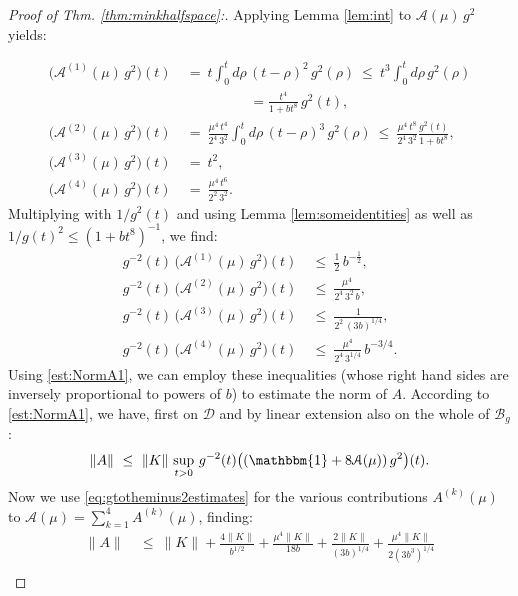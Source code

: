 \documentclass[b5paper,draft,openbib,12pt]{memoir}
\newcommand{\id}{\mathbbm{1}}
\newcommand{\Banach}{\mathscr{B}}
\begin{document}
\begin{proof}[Proof of Thm. \ref{thm:minkhalfspace}:] Applying 
Lemma \ref{lem:int} to \(\mathcal{A}(\mu) \,g^2\) yields:

\begin{align}
    \big(\mathcal{A}^{(1)}(\mu) \, g^2\big)(t)&~=~ t \int_0^t d\rho \, (t-\rho)^2\, g^2(\rho)~\le~ t^3 \int_0^t d\rho \,g^2(\rho)\nonumber\\
    &\hspace{2cm} = \frac{t^4}{1+b t^8} \,g^2(t),\nonumber\\
     \big(\mathcal{A}^{(2)}(\mu) \, g^2\big)(t)&~=~ \frac{\mu^4\, t^4}{2^4\, 3^2} \int_0^t d\rho\, (t-\rho)^3\, g^2(\rho)~\le~ \frac{\mu^4\, t^8}{2^4 \,3^2} \frac{g^2(t)}{1+b t^8},\nonumber\\
    \big( \mathcal{A}^{(3)}(\mu) \, g^2\big) (t) &~=~ t^2,\nonumber\\
    \big( \mathcal{A}^{(4)}(\mu) \, g^2 \big)(t) &~=~ \frac{\mu^4\, t^6}{2^2\, 3^2}.
\end{align}
Multiplying with \(1/g^2(t)\) and using Lemma 
\ref{lem:someidentities} as well as $1/g(t)^2 \le (1+b t^8)^{-1}$, 
we find:
\begin{align}
    g^{-2}(t)\, \big(\mathcal{A}^{(1)}(\mu) \,g^2\big)(t) & ~\le~ \frac{1}{2} \, b^{-\frac{1}{2}},\nonumber\\
    g^{-2}(t)\, \big(\mathcal{A}^{(2)}(\mu) \,g^2\big)(t) & ~\le~ \frac{\mu^4}{2^4 \,3^2 \,b},\nonumber\\
    g^{-2}(t)\, \big( \mathcal{A}^{(3)}(\mu) \, g^2\big)(t) & ~\le~ \frac{1}{2^2\, (3b)^{1/4}},\nonumber\\
   g^{-2}(t)\, \big( \mathcal{A}^{(4)}(\mu) \, g^2\big) (t) & ~\le~ \frac{\mu^4}{2^4 \, 3^{1/4}} \, b^{-3/4}.
\label{eq:gtotheminus2estimates}
\end{align}
Using \eqref{est:NormA1}, we can employ these inequalities (whose 
right hand sides are inversely proportional to powers of $b$) to 
estimate the norm of $A$. According to \eqref{est:NormA1}, we have, 
first on $\mathscr{D}$ and by linear extension also on the whole of 
$\Banach_g$: 
\begin{equation}
	\|A\| ~\leq~ \|K\| \, \sup_{t>0}\, g^{-2}(t) \big((\id + 8\mathcal{A}(\mu)) \, g^2 \big)(t) .
\end{equation}
Now we use \eqref{eq:gtotheminus2estimates} for the various 
contributions 
$A^{(k)}(\mu) $ to $\mathcal{A}(\mu) = \sum_{k=1}^4 A^{(k)}(\mu)$, 
finding:
\begin{align}
	\|A\| & ~\le~ \|K\| + \frac{4 \|K\|}{b^{1/2}} + \frac{\mu^4 \|K\|}{18 b} + \frac{2 \|K\|}{(3b)^{1/4}} + \frac{\mu^4 \|K\|}{2 (3b^3)^{1/4}}\nonumber\\

\end{align}
\end{proof}
\end{document}
